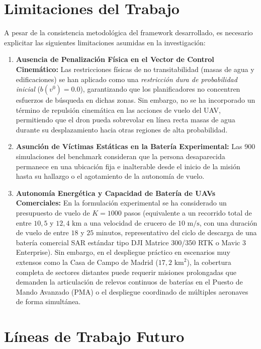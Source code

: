 \section{Limitaciones del Trabajo}

A pesar de la consistencia metodológica del framework desarrollado, es necesario explicitar las siguientes limitaciones asumidas en la investigación:

\begin{enumerate}
    \item \textbf{Ausencia de Penalización Física en el Vector de Control Cinemático:} 
    Las restricciones físicas de no transitabilidad (masas de agua y edificaciones) se han aplicado como una \textit{restricción dura de probabilidad inicial} ($b(v^0) = 0.0$), garantizando que los planificadores no concentren esfuerzos de búsqueda en dichas zonas. Sin embargo, no se ha incorporado un término de repulsión cinemática en las acciones de vuelo del UAV, permitiendo que el dron pueda sobrevolar en línea recta masas de agua durante su desplazamiento hacia otras regiones de alta probabilidad.

    \item \textbf{Asunción de Víctimas Estáticas en la Batería Experimental:} 
    Las 900 simulaciones del benchmark consideran que la persona desaparecida permanece en una ubicación fija e inalterable desde el inicio de la misión hasta su hallazgo o el agotamiento de la autonomía de vuelo.

    \item \textbf{Autonomía Energética y Capacidad de Batería de UAVs Comerciales:} 
    En la formulación experimental se ha considerado un presupuesto de vuelo de $K = 1000$ pasos (equivalente a un recorrido total de entre $10{,}5$ y $12{,}4\text{ km}$ a una velocidad de crucero de $10\text{ m/s}$, con una duración de vuelo de entre $18$ y $25\text{ minutos}$, representativo del ciclo de descarga de una batería comercial SAR estándar tipo DJI Matrice 300/350 RTK o Mavic 3 Enterprise). Sin embargo, en el despliegue práctico en escenarios muy extensos como la Casa de Campo de Madrid ($17{,}2\text{ km}^2$), la cobertura completa de sectores distantes puede requerir misiones prolongadas que demanden la articulación de relevos continuos de baterías en el Puesto de Mando Avanzado (PMA) o el despliegue coordinado de múltiples aeronaves de forma simultánea.
\end{enumerate}

\section{Líneas de Trabajo Futuro}

